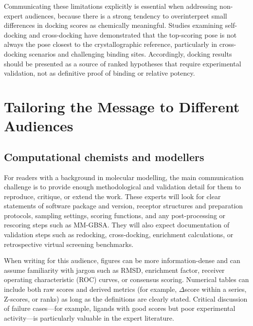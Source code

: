 \documentclass[12pt]{article}
\begin{document}
Communicating these limitations explicitly is essential when addressing non-expert audiences, because there is a strong tendency to overinterpret small differences in docking scores as chemically meaningful.\cite{CH11_BindingAffinity2018,CH11_IsItReliable2018,CH11_Berry2015} 
Studies examining self-docking and cross-docking have demonstrated that the top-scoring pose is not always the pose closest to the crystallographic reference, particularly in cross-docking scenarios and challenging binding sites.\cite{CH11_IsItReliable2018,CH11_Warren2006,CH11_cosconati2010} 
Accordingly, docking results should be presented as a source of ranked hypotheses that require experimental validation, not as definitive proof of binding or relative potency.\cite{CH11_Forli2015,CH11_Cheng2012,CH11_zhu2022} 

\section{Tailoring the Message to Different Audiences}

\subsection{Computational chemists and modellers}

For readers with a background in molecular modelling, the main communication challenge is to provide enough methodological and validation detail for them to reproduce, critique, or extend the work.\cite{CH11_Berry2015,CH11_Kitchen2004,CH11_cosconati2010} 
These experts will look for clear statements of software package and version, receptor structures and preparation protocols, sampling settings, scoring functions, and any post-processing or rescoring steps such as MM-GBSA.\cite{CH11_Pagadala2017,CH11_Berry2015,CH11_EmpiricalScoring2018} 
They will also expect documentation of validation steps such as redocking, cross-docking, enrichment calculations, or retrospective virtual screening benchmarks.\cite{CH11_Warren2006,CH11_Forli2015,CH11_Cheng2012} 

When writing for this audience, figures can be more information-dense and can assume familiarity with jargon such as RMSD, enrichment factor, receiver operating characteristic (ROC) curves, or consensus scoring.\cite{CH11_Forli2015,CH11_EmpiricalScoring2018,CH11_ConsensusDocking2023} 
Numerical tables can include both raw scores and derived metrics (for example, \(\Delta\)score within a series, Z-scores, or ranks) as long as the definitions are clearly stated.\cite{CH11_EmpiricalScoring2018,CH11_Kitchen2004,CH11_Berry2015} 
Critical discussion of failure cases---for example, ligands with good scores but poor experimental activity---is particularly valuable in the expert literature.\cite{CH11_BindingAffinity2018,CH11_IsItReliable2018,CH11_Plewczynski2011} 
\end{document}
